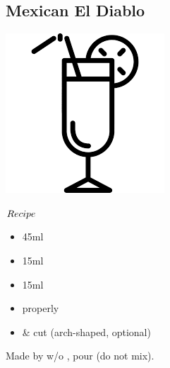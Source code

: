 \subsection{Mexican El Diablo}
\vspace{-7.8mm}
\hspace{52mm}
\includegraphics[scale=.07]{cocktail_glass_tall.png}
\vspace{2.mm}
\begin{itembox}[l]{\boldmath $Recipe$}
\begin{itemize}
\setlength{\parskip}{0cm}
\setlength{\itemsep}{0cm}
\item \teq 45ml
\item \cc 15ml
\item \limj 15ml
\item \ga properly
\item \cherry \& \lemon cut (arch-shaped, optional)
\end{itemize}
\vspace{-4mm}
Made by \build w/o \ga
\hspace{-1mm}, pour \ga (do not mix).
\end{itembox}
